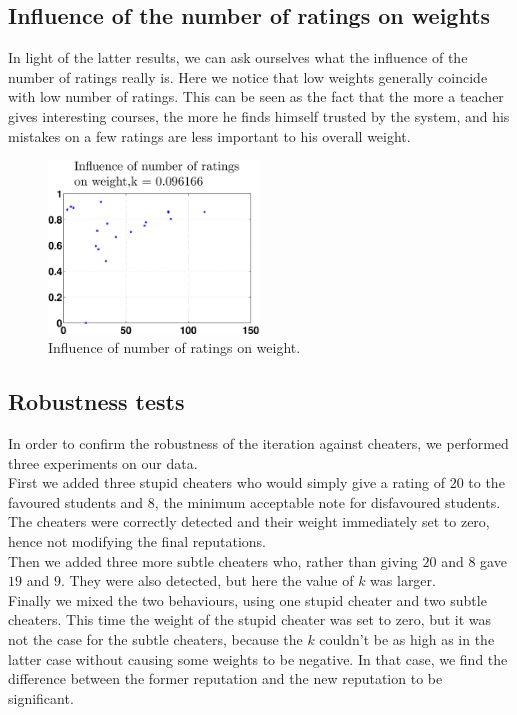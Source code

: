 \documentclass[12pt,a4paper]{article}
\begin{document}
\subsection*{Influence of the number of ratings on weights}
In light of the latter results, we can ask ourselves what the influence of the number of ratings really is. Here we notice that low weights generally coincide with low number of ratings. This can be seen as the fact that the more a teacher gives interesting courses, the more he finds himself trusted by the system, and his mistakes on a few ratings are less important to his overall weight.
\begin{figure}
\centering
\includegraphics[width = 0.5\textwidth]{preprocessSelect/ppsnumRatvsWK3fb89e54e9211a25.eps}
\caption{Influence of number of ratings on weight.}
\end{figure}

\FloatBarrier

\subsection{Robustness tests}
In order to confirm the robustness of the iteration against cheaters, we performed three experiments on our data.\\
 First we added three stupid cheaters who would simply give a rating of $20$ to the favoured students and $8$, the minimum acceptable note for disfavoured students. The cheaters were correctly detected and their weight immediately set to zero, hence not modifying the final reputations.\\
 Then we added three more subtle cheaters who, rather than giving $20$ and $8$ gave $19$ and $9$. They were also detected, but here the value of $k$ was larger.\\
 Finally we mixed the two behaviours, using one stupid cheater and two subtle cheaters. This time the weight of the stupid cheater was set to zero, but it was not the case for the subtle cheaters, because the $k$ couldn't be as high as in the latter case without causing some weights to be negative. In that case, we find the difference between the former reputation and the new reputation to be significant.\\
 
\end{document}
